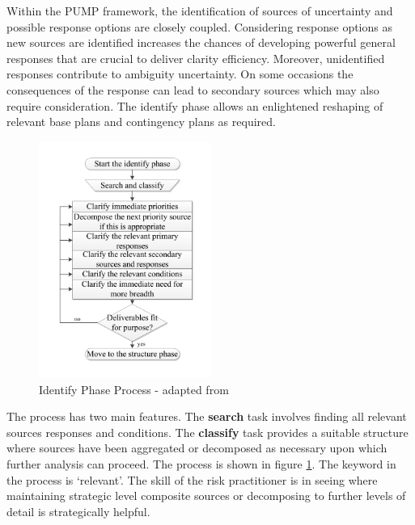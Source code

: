 Within the PUMP framework, the identification of sources of uncertainty and possible response options are closely coupled. 
Considering response options as new sources are identified increases the chances of developing powerful general responses that are crucial to deliver clarity efficiency. 
Moreover, unidentified responses contribute to ambiguity uncertainty. 
On some occasions the consequences of the response can lead to secondary sources which may also require consideration.
The identify phase allows an enlightened reshaping of relevant base plans and contingency plans as required.

\begin{figure}[!h]
  \centering
    \includegraphics[width = 0.5\textwidth]{./Figures/Identify.pdf} 
\caption{Identify Phase Process - adapted from \cite{chapman}}
\label{Figure:Identify}
\end{figure}

The process has two main features. 
The \textbf{search} task involves finding all relevant sources responses and conditions. 
The \textbf{classify} task provides a suitable structure where sources have been aggregated or decomposed as necessary upon which further analysis can proceed.
The process is shown in figure \ref{Figure:Identify}.
The keyword in the process is `relevant'. 
The skill of the risk practitioner is in seeing where maintaining strategic level composite sources or decomposing to further levels of detail is strategically helpful.





